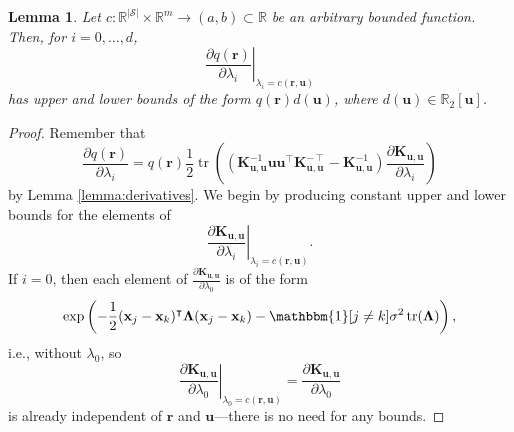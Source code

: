 \documentclass{article}
\newtheorem{lemma}[theorem]{Lemma}
\theoremstyle{definition}
\theoremstyle{remark}
\DeclareMathOperator{\tr}{tr}
\newcommand{\Kuu}{\mathbf{K}_{\mathbf{u},\mathbf{u}}}
\begin{document}
\begin{lemma} \label{lemma:bound1}
  Let $c : \mathbb{R}^{|\mathcal{S}|} \times \mathbb{R}^m \to (a, b) \subset
  \mathbb{R}$ be an arbitrary bounded function. Then, for $i = 0,
  \dots, d$,
  \[
    \left. \frac{\partial q(\mathbf{r})}{\partial \lambda_i} \right|_{\lambda_i
      = c(\mathbf{r}, \mathbf{u})}
  \]
  has upper and lower bounds of the form $q(\mathbf{r})d(\mathbf{u})$, where
  $d(\mathbf{u}) \in \mathbb{R}_2[\mathbf{u}]$.
\end{lemma}
\begin{proof}
  Remember that
  \[
    \frac{\partial q(\mathbf{r})}{\partial \lambda_i} =
    q(\mathbf{r})\frac{1}{2}\tr
    \left((\Kuu^{-1}\mathbf{u}\mathbf{u}^\intercal\Kuu^{-\intercal} - \Kuu^{-1})
      \frac{\partial \Kuu}{\partial \lambda_i}
    \right)
  \]
  by Lemma \ref{lemma:derivatives}. We begin by producing constant upper and
  lower bounds for the elements of
  \[
    \left. \frac{\partial \Kuu}{\partial \lambda_i} \right|_{\lambda_i =
      c(\mathbf{r}, \mathbf{u})}.
  \]
  If $i = 0$, then each element of $\frac{\partial
    \Kuu}{\partial \lambda_0}$ is of the form
  \[
    \exp \left( -\frac{1}{2}(\mathbf{x}_j - \mathbf{x}_k)^\intercal
      \bm\Lambda (\mathbf{x}_j - \mathbf{x}_k) - \mathbbm{1}[j \ne
      k]\sigma^2\tr(\bm\Lambda) \right),
  \]
  i.e., without $\lambda_0$, so
  \[
    \left. \frac{\partial \Kuu}{\partial \lambda_0} \right|_{\lambda_0 =
      c(\mathbf{r}, \mathbf{u})} = \frac{\partial \Kuu}{\partial \lambda_0}
  \]
  is already independent of $\mathbf{r}$ and $\mathbf{u}$---there is no need
  for any bounds.


\end{proof}
\end{document}
